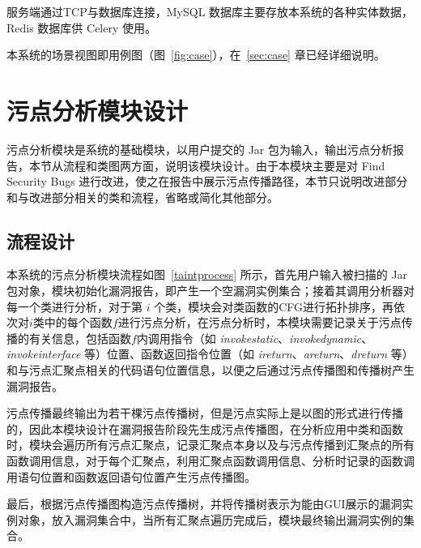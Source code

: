 服务端通过TCP与数据库连接，MySQL 数据库主要存放本系统的各种实体数据，Redis 数据库供 Celery 使用。


本系统的场景视图即用例图（图~\ref{fig:case}），在~\ref{sec:case} 章已经详细说明。

\section{污点分析模块设计}

污点分析模块是系统的基础模块，以用户提交的 Jar 包为输入，输出污点分析报告，本节从流程和类图两方面，说明该模块设计。由于本模块主要是对 Find Security Bugs 进行改进，使之在报告中展示污点传播路径，本节只说明改进部分和与改进部分相关的类和流程，省略或简化其他部分。

\subsection{流程设计}
本系统的污点分析模块流程如图~\ref{taintprocess} 所示，首先用户输入被扫描的 Jar 包对象，模块初始化漏洞报告，即产生一个空漏洞实例集合；接着其调用分析器对每一个类进行分析，对于第 $i$ 个类，模块会对类函数的CFG进行拓扑排序，再依次对$i$类中的每个函数$f$进行污点分析，在污点分析时，本模块需要记录关于污点传播的有关信息，包括函数$f$内调用指令（如 \textit{invokestatic}、\textit{invokedynamic}、\textit{invokeinterface} 等）位置、函数返回指令位置（如 \textit{ireturn}、\textit{areturn}、\textit{dreturn} 等）和与污点汇聚点相关的代码语句位置信息，以便之后通过污点传播图和传播树产生漏洞报告。

污点传播最终输出为若干棵污点传播树，但是污点实际上是以图的形式进行传播的，因此本模块设计在漏洞报告阶段先生成污点传播图，在分析应用中类和函数时，模块会遍历所有污点汇聚点，记录汇聚点本身以及与污点传播到汇聚点的所有函数调用信息，对于每个汇聚点，利用汇聚点函数调用信息、分析时记录的函数调用语句位置和函数返回语句位置产生污点传播图。

最后，根据污点传播图构造污点传播树，并将传播树表示为能由GUI展示的漏洞实例对象，放入漏洞集合中，当所有汇聚点遍历完成后，模块最终输出漏洞实例的集合。

